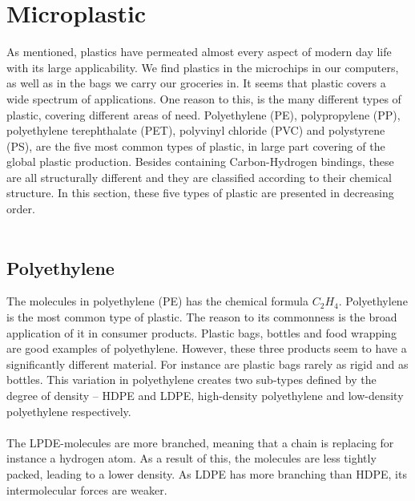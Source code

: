 \vspace{1.3cm}
\section{Microplastic}
As mentioned, plastics have permeated almost every aspect of modern day life with its large applicability. We find plastics in the microchips in our computers, as well as in the bags we carry our groceries in. It seems that plastic covers a wide spectrum of applications.  One reason to this, is the many different types of plastic, covering different areas of need. Polyethylene (PE), polypropylene (PP), polyethylene terephthalate (PET), polyvinyl chloride (PVC) and polystyrene (PS), are the five most common types of plastic, in large part covering of the global plastic production. Besides containing Carbon-Hydrogen bindings, these are all structurally different and they are classified according to their chemical structure. In this section, these five types of plastic are presented in decreasing order. 
\\\\

\subsection{Polyethylene}
The molecules in polyethylene (PE) has the chemical formula $C_2H_4$. Polyethylene is the most common type of plastic. The reason to its commonness is the broad application of it in consumer products. Plastic bags, bottles and food wrapping are good examples of polyethylene. However, these three products seem to have a significantly different material. For instance are plastic bags rarely as rigid and as bottles. This variation in polyethylene creates two sub-types defined by the degree of density – HDPE and LDPE, high-density polyethylene and low-density polyethylene respectively. 
\\\\
The LPDE-molecules are more branched, meaning that a chain is replacing for instance a hydrogen atom. As a result of this, the molecules are less tightly packed, leading to a lower density.  As LDPE has more branching than HDPE, its intermolecular forces are weaker. 



